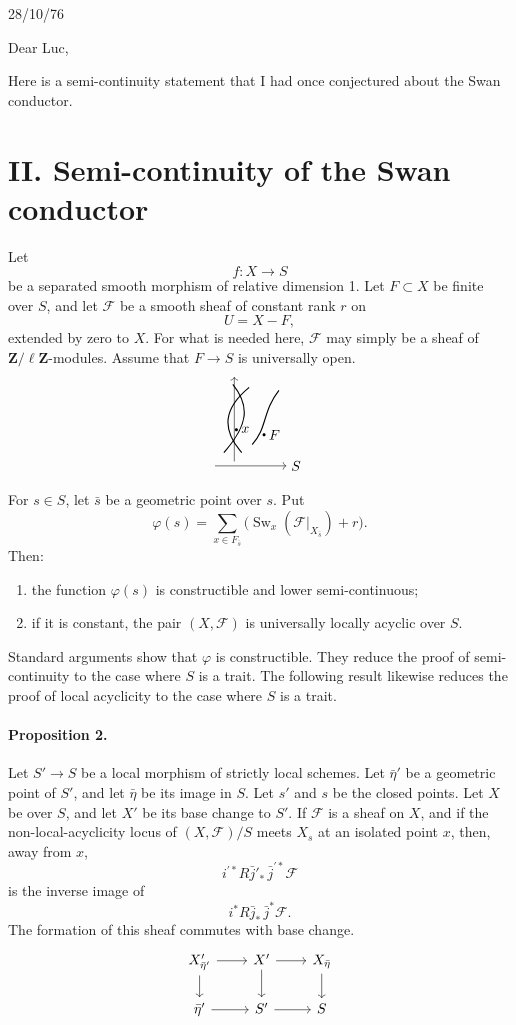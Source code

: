 \documentclass[11pt]{article}
\newcommand{\semistableSketch}{%
\begin{tikzpicture}[scale=.75,baseline=-.5ex]
  \draw[->] (-.2,0) -- (2.2,0) node[right]{$S$};
  \draw[->] (.45,.15) -- (.45,3.0);
  \draw[thick] (.1,.45) .. controls (.9,1.35) and (1.0,2.0) .. (.4,2.75);
  \draw[thick] (.7,.45) .. controls (.0,1.25) and (.1,1.95) .. (.95,2.65);
  \draw[thick] (1.05,.72) .. controls (1.55,1.25) and (1.4,1.85) .. (1.95,2.55);
  \fill (.52,1.22) circle (1.5pt) node[right]{$x$};
  \fill (1.45,1.05) circle (1.5pt) node[right]{$F$};
\end{tikzpicture}%
}
\newcommand{\F}{\mathcal F}
\newcommand{\Zell}{\mathbf Z/\ell\mathbf Z}
\DeclareMathOperator{\Sw}{Sw}
\begin{document}
\begin{flushright}
28/10/76
\end{flushright}

Dear Luc,

Here is a semi-continuity statement that I had once conjectured about the Swan conductor.

\section*{II. Semi-continuity of the Swan conductor}

Let
\[
  f:X\longrightarrow S
\]
be a separated smooth morphism of relative dimension 1. Let \(F\subset X\) be finite over \(S\), and let \(\F\) be a smooth sheaf of constant rank \(r\) on
\[
  U=X-F,
\]
extended by zero to \(X\). For what is needed here, \(\F\) may simply be a sheaf of \(\Zell\)-modules. Assume that \(F\to S\) is universally open.
\[
\semistableSketch
\]

For \(s\in S\), let \(\bar s\) be a geometric point over \(s\). Put
\[
  \varphi(s)=\sum_{x\in F_{\bar s}}
  \bigl(\Sw_x(\F|_{X_{\bar s}})+r\bigr).
\]
Then:
\begin{enumerate}[label=(\roman*)]
\item the function \(\varphi(s)\) is constructible and lower semi-continuous;
\item if it is constant, the pair \((X,\F)\) is universally locally acyclic over \(S\).
\end{enumerate}

Standard arguments show that \(\varphi\) is constructible. They reduce the proof of semi-continuity to the case where \(S\) is a trait. The following result likewise reduces the proof of local acyclicity to the case where \(S\) is a trait.

\paragraph{Proposition 2.}
Let \(S'\to S\) be a local morphism of strictly local schemes. Let \(\bar\eta'\) be a geometric point of \(S'\), and let \(\bar\eta\) be its image in \(S\). Let \(s'\) and \(s\) be the closed points. Let \(X\) be over \(S\), and let \(X'\) be its base change to \(S'\). If \(\F\) is a sheaf on \(X\), and if the non-local-acyclicity locus of \((X,\F)/S\) meets \(X_s\) at an isolated point \(x\), then, away from \(x\),
\[
  i^{\prime *} R\bar j'_{*}\,\bar j^{\prime *}\F
\]
is the inverse image of
\[
  i^{*}R\bar j_{*}\,\bar j^{*}\F.
\]
The formation of this sheaf commutes with base change.
\[
\begin{tikzcd}[column sep=2.2em,row sep=1.6em]
X'_{\bar\eta'} \arrow[r] \arrow[d] & X' \arrow[r] \arrow[d] & X_{\bar\eta} \arrow[d] \\
\bar\eta' \arrow[r] & S' \arrow[r] & S
\end{tikzcd}
\]
\end{document}
